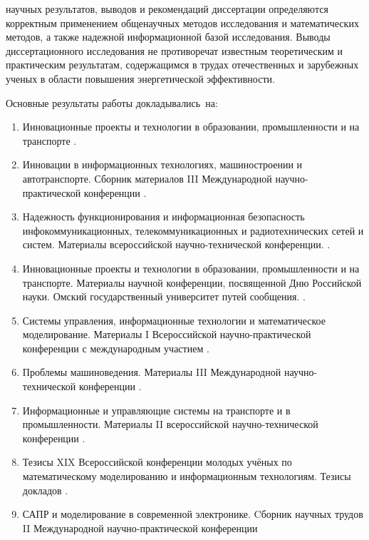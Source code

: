 {\reliability} 
научных результатов, выводов и рекомендаций диссертации определяются корректным применением
общенаучных методов исследования и математических методов, а также
надежной информационной базой исследования. Выводы диссертационного исследования не противоречат известным теоретическим и практическим результатам, содержащимся в трудах отечественных и зарубежных ученых в области повышения энергетической эффективности.



{\probation}
Основные результаты работы докладывались~на:
\begin{enumerate}
\item Инновационные проекты и технологии в образовании, промышленности и на транспорте \cite{comparative_study2020}.  

\item Инновации в информационных технологиях, машиностроении и автотранспорте. Сборник материалов III Международной научно-практической конференции \cite{complexity_assessment2019}.

\item Надежность функционирования и информационная безопасность инфокоммуникационных, телекоммуникационных и радиотехнических сетей и систем. Материалы всероссийской научно-технической конференции. \cite{modern_information2019}. 

\item Инновационные проекты и технологии в образовании, промышленности и на транспорте. Материалы научной конференции, посвященной Дню Российской науки. Омский государственный университет путей сообщения. \cite{comparative_analysis2019}.

\item Системы управления, информационные технологии и математическое моделирование. Материалы I Всероссийской научно-практической конференции с международным участием \cite{comparative_analysis_2019}.

\item Проблемы машиноведения. Материалы III Международной научно-технической конференции \cite{cache_oriented2019}.

\item Информационные и управляющие системы на транспорте и в промышленности. Материалы II всероссийской научно-технической конференции \cite{accuracy_study2018}.

\item Тезисы XIX Всероссийской конференции молодых учёных по математическому моделированию и информационным технологиям. Тезисы докладов \cite{efficiency_mark2018}.

\item  САПР и моделирование в современной электронике. Cборник научных трудов II Международной научно-практической конференции \cite{information-measuring2018}

\end{enumerate}

